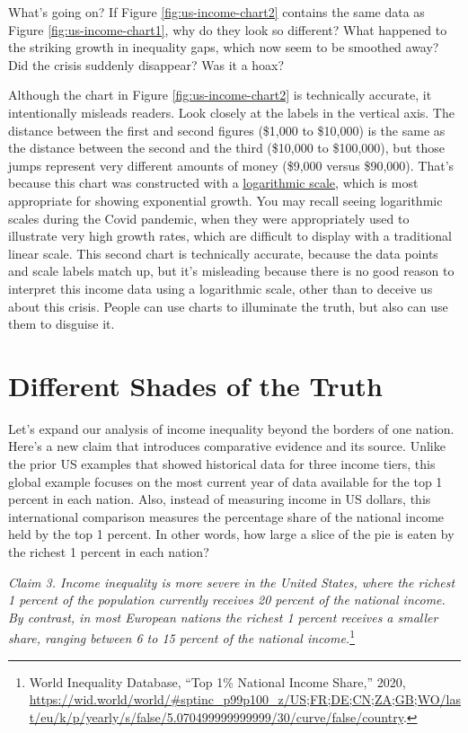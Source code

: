 \documentclass[
  english,
]{book}
\begin{document}
What's going on? If Figure \ref{fig:us-income-chart2} contains the same data as Figure \ref{fig:us-income-chart1}, why do they look so different? What happened to the striking growth in inequality gaps, which now seem to be smoothed away? Did the crisis suddenly disappear? Was it a hoax?

Although the chart in Figure \ref{fig:us-income-chart2} is technically accurate, it intentionally misleads readers. Look closely at the labels in the vertical axis. The distance between the first and second figures (\$1,000 to \$10,000) is the same as the distance between the second and the third (\$10,000 to \$100,000), but those jumps represent very different amounts of money (\$9,000 versus \$90,000). That's because this chart was constructed with a \href{https://en.wikipedia.org/wiki/Logarithmic_scale}{logarithmic scale}, which is most appropriate for showing exponential growth. You may recall seeing logarithmic scales during the Covid pandemic, when they were appropriately used to illustrate very high growth rates, which are difficult to display with a traditional linear scale. This second chart is technically accurate, because the data points and scale labels match up, but it's misleading because there is no good reason to interpret this income data using a logarithmic scale, other than to deceive us about this crisis. People can use charts to illuminate the truth, but also can use them to disguise it.

\hypertarget{shades}{%
\section*{Different Shades of the Truth}\label{shades}}

Let's expand our analysis of income inequality beyond the borders of one nation. Here's a new claim that introduces comparative evidence and its source. Unlike the prior US examples that showed historical data for three income tiers, this global example focuses on the most current year of data available for the top 1 percent in each nation. Also, instead of measuring income in US dollars, this international comparison measures the percentage share of the national income held by the top 1 percent. In other words, how large a slice of the pie is eaten by the richest 1 percent in each nation?

\emph{Claim 3. Income inequality is more severe in the United States, where the richest 1 percent of the population currently receives 20 percent of the national income. By contrast, in most European nations the richest 1 percent receives a smaller share, ranging between 6 to 15 percent of the national income.}\footnote{World Inequality Database, {``Top 1\% {National Income Share},''} 2020, \url{https://wid.world/world/\#sptinc_p99p100_z/US;FR;DE;CN;ZA;GB;WO/last/eu/k/p/yearly/s/false/5.070499999999999/30/curve/false/country}.}
\end{document}
